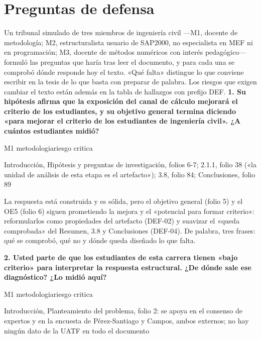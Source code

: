 \section{Preguntas de defensa}
Un tribunal simulado de tres miembros de ingeniería civil —M1, docente de metodología; M2, estructuralista usuario de SAP2000, no especialista en MEF ni en programación; M3, docente de métodos numéricos con interés pedagógico— formuló las preguntas que haría tras leer el documento, y para cada una se comprobó dónde responde hoy el texto. «Qué falta» distingue lo que conviene escribir en la tesis de lo que basta con preparar de palabra. Los riesgos que exigen cambiar el texto están además en la tabla de hallazgos con prefijo DEF.
\noindent\casilla\textbf{1. Su hipótesis afirma que la exposición del canal de cálculo mejorará el criterio de los estudiantes, y su objetivo general termina diciendo «para mejorar el criterio de los estudiantes de ingeniería civil». ¿A cuántos estudiantes midió?}\par
{\small\color{gris}\sffamily M1 metodologia\quad{}\quad riesgo critica}\par
{\small{}Introducción, Hipótesis y preguntas de investigación, folios 6-7; 2.1.1, folio 38 («la unidad de análisis de esta etapa es el artefacto»); 3.8, folio 84; Conclusiones, folio 89\par}
{\small{}La respuesta está construida y es sólida, pero el objetivo general (folio 5) y el OE5 (folio 6) siguen prometiendo la mejora y el «potencial para formar criterio»: reformularlos como propiedades del artefacto (DEF-02) y suavizar el «queda comprobada» del Resumen, 3.8 y Conclusiones (DEF-04). De palabra, tres frases: qué se comprobó, qué no y dónde queda diseñado lo que falta.\par}
\vspace{5pt}
\noindent\casilla\textbf{2. Usted parte de que los estudiantes de esta carrera tienen «bajo criterio» para interpretar la respuesta estructural. ¿De dónde sale ese diagnóstico? ¿Lo midió aquí?}\par
{\small\color{gris}\sffamily M1 metodologia\quad{}\quad riesgo critica}\par
{\small{}Introducción, Planteamiento del problema, folio 2: se apoya en el consenso de expertos y en la encuesta de Pérez-Santiago y Campos, ambos externos; no hay ningún dato de la UATF en todo el documento\par}

